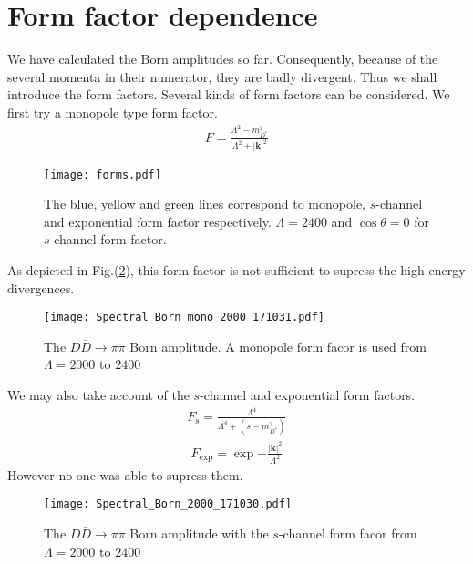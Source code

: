 \documentclass[aps,prd,preprintnumbers,showpacs,showkeys,nofootinbib,
superscriptaddress,fleqn,floatfix,tightenlines, 10pt]{revtex4-1}
\begin{document}
\section{Form factor dependence}
We have calculated the Born amplitudes so far. Consequently, because of the several momenta in their numerator,
they are badly divergent. Thus we shall introduce the form factors. Several kinds of form factors can be considered.
We first try a monopole type form factor.
\begin{align}
	F = \frac{\Lambda^2 - m_{D^*}^2}{\Lambda^2 + |\mathbf{k}|^2}
\end{align}
\begin{figure}[H]
	\centering
	\texttt{[image: forms.pdf]}
	\caption{The blue, yellow and green lines correspond to monopole, $s$-channel and exponential form factor respectively.
	$\Lambda=2400$ and $\cos{\theta}=0$ for $s$-channel form factor.}
	\label{form}
\end{figure}
As depicted in Fig.(\ref{Born monoff}), this form factor is not sufficient to supress the high energy divergences.
\begin{figure}[H]
	\centering
	\texttt{[image: Spectral\_Born\_mono\_2000\_171031.pdf]}
	\caption{The $D \bar{D} \rightarrow \pi\pi$ Born amplitude. A monopole form facor is used from $\Lambda=2000$ to $2400$}
	\label{Born monoff}
\end{figure}
We may also take account of the $s$-channel and exponential form factors.
\begin{align}
	F_{\mathrm{s}} = \frac{\Lambda^4}{\Lambda^4 + \left( s - m_{D^*}^2 \right)}
\end{align}
\begin{align}
	F_{\mathrm{exp}} = \exp{-\frac{|\mathbf{k}|^2}{\Lambda^2}}
\end{align}
However no one was able to supress them.
\begin{figure}[!t]
	\centering
	\texttt{[image: Spectral\_Born\_2000\_171030.pdf]}
	\caption{The $D \bar{D} \rightarrow \pi\pi$ Born amplitude with the $s$-channel form facor from $\Lambda=2000$ to $2400$}
	\label{schff}
\end{figure}
%
\end{document}
